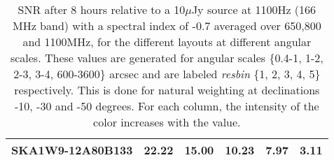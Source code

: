 \begin{table}[htp]
{{\begin{tabular}{|lccccc|}
SKA1W9-12A80B133 & 22.22 \cellcolor{blue!60.00} & 15.00 \cellcolor{red!29.00} & 10.23 \cellcolor{green!35.39} & 7.97 \cellcolor{orange!18.00} & 3.11 \cellcolor{purple!21.65}\\ \hline 
\end{tabular}}
\vspace{0.000000cm}
\hfill
{}
\vspace{0.000000cm}
\hfill 

\vspace{0cm}
\caption{SNR after 8 hours relative to a 10$\mu$Jy source at 1100Hz (166 MHz band) with a spectral index of -0.7 averaged over
650,800 and 1100MHz, for the different layouts at different angular scales. These values are generated for angular scales \{0.4-1,
1-2, 2-3, 3-4, 600-3600\} arcsec and are labeled {\it resbin} \{1, 2, 3, 4, 5\} respectively. This is done for natural weighting
at declinations -10, -30 and -50 degrees. For each column, the intensity of the color increases with the
value.}\label{tab:snravg}}
 \end{table}
